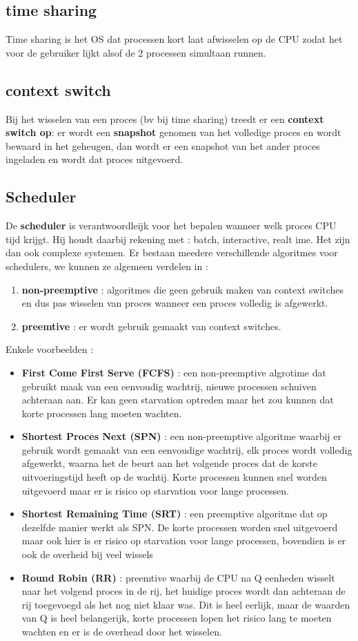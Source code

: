 \documentclass{report}
\begin{document}
   			\subsection{time sharing}
   				Time sharing is het OS dat processen kort laat afwisselen op de CPU zodat het voor de gebruiker lijkt alsof de 2 processen simultaan runnen. 
   			\subsection{context switch}
   				Bij het wisselen van een proces (bv bij time sharing) treedt er een \textbf{context switch op}: er wordt een \textbf{snapshot} genomen van het volledige proces en wordt bewaard in het geheugen, dan wordt er een snapshot van het ander proces ingeladen en wordt dat proces uitgevoerd.
   			\subsection{Scheduler}
   				De \textbf{scheduler} is verantwoordleijk voor het bepalen wanneer welk proces CPU tijd krijgt. Hij houdt daarbij rekening met : batch, interactive, realt ime. Het zijn dan ook complexe systemen. Er bestaan meedere verschillende algoritmes voor schedulers, we kunnen ze algemeen verdelen in : 
   				\begin{enumerate}
   					\item \textbf{non-preemptive} : algoritmes die geen gebruik maken van context switches en dus pas wisselen van proces wanneer een proces volledig is afgewerkt.
   					\item \textbf{preemtive} : er wordt gebruik gemaakt van context switches.
   				\end{enumerate}
   				Enkele voorbeelden : 
   				\begin{itemize}
   					\item \textbf{First Come First Serve (FCFS)} : een non-preemptive algrotime dat gebruikt maak van een eenvoudig wachtrij, nieuwe processen schuiven achteraan aan. Er kan geen starvation optreden maar het zou kunnen dat korte processen lang moeten wachten.
   					\item \textbf{Shortest Proces Next (SPN)} : een non-preemptive algoritme waarbij er gebruik wordt gemaakt van een eenvoudige wachtrij, elk proces wordt volledig afgewerkt, waarna het de beurt aan het volgende proces dat de korste uitvoeringstijd heeft op de wachtij. Korte processen kunnen snel worden uitgevoerd maar er is risico op starvation voor lange processen.
   					\item \textbf{Shortest Remaining Time (SRT)} : een preemptive algoritme dat op dezelfde manier werkt als SPN. De korte processen worden snel uitgevoerd maar ook hier is er risico op starvation voor lange processen, bovendien is er ook de overheid bij veel wissels
   					\item \textbf{Round Robin (RR)} : preemtive waarbij de CPU na Q eenheden wisselt naar het volgend proces in de rij, het huidige proces wordt dan achteraan de rij toegevoegd als het nog niet klaar was. Dit is heel eerlijk, maar de waarden van Q is heel belangerijk, korte processen lopen het risico lang te moeten wachten en er is de overhead door het wisselen. 
   				\end{itemize}
\end{document}
